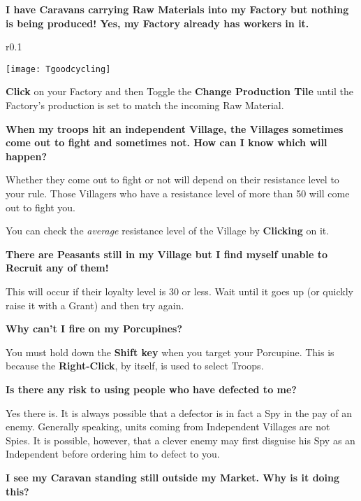 {\large \textbf{\textsf{I have Caravans carrying Raw Materials into my Factory but nothing is being produced! Yes, my Factory already has workers in it.}}}

\begin{wrapfigure}{r}{0.1\textwidth}
    \vspace{-20pt}
    \begin{center}
        \texttt{[image: Tgoodcycling]}
    \end{center}
    \vspace{-20pt}
\end{wrapfigure}

\textbf{Click} on your Factory and then Toggle the \textbf{Change Production Tile} until the Factory’s production is set to match the incoming Raw Material.

{\large \textbf{\textsf{When my troops hit an independent Village, the Villages sometimes come out to fight and sometimes not. How can I know which will happen?}}}

Whether they come out to fight or not will depend on their resistance level to your rule. Those Villagers who have a resistance level of more than 50 will come out to fight you.

You can check the \textit{average} resistance level of the Village by \textbf{Clicking} on it.

{\large \textbf{\textsf{There are Peasants still in my Village but I find myself unable to Recruit any of them!}}}

This will occur if their loyalty level is 30 or less. Wait until it goes up (or quickly raise it with a Grant) and then try again.

{\large \textbf{\textsf{Why can’t I fire on my Porcupines?}}}


You must hold down the \textbf{Shift key} when you target your Porcupine. This is because the \textbf{Right-Click}, by itself, is used to select Troops.

{\large \textbf{\textsf{Is there any risk to using people who have defected to me?}}}

Yes there is. It is always possible that a defector is in fact a Spy in the pay of an enemy. Generally speaking, units coming from Independent Villages are not Spies. It is possible, however, that a clever enemy may first disguise his Spy as an Independent before ordering him to defect to you.

{\large \textbf{\textsf{I see my Caravan standing still outside my Market. Why is it doing this?}}}

